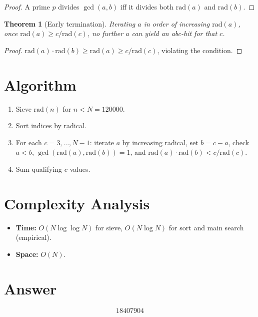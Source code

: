 \documentclass[11pt,a4paper]{article}
\newtheorem{theorem}{Theorem}
\begin{document}
\begin{proof}
A prime $p$ divides $\gcd(a,b)$ iff it divides both $\mathrm{rad}(a)$ and $\mathrm{rad}(b)$.
\end{proof}

\begin{theorem}[Early termination]
Iterating $a$ in order of increasing $\mathrm{rad}(a)$, once $\mathrm{rad}(a) \ge c/\mathrm{rad}(c)$, no further $a$ can yield an abc-hit for that $c$.
\end{theorem}

\begin{proof}
$\mathrm{rad}(a) \cdot \mathrm{rad}(b) \ge \mathrm{rad}(a) \ge c/\mathrm{rad}(c)$, violating the condition.
\end{proof}

\section{Algorithm}

\begin{enumerate}
\item Sieve $\mathrm{rad}(n)$ for $n < N = 120000$.
\item Sort indices by radical.
\item For each $c = 3, \ldots, N-1$: iterate $a$ by increasing radical, set $b = c - a$, check $a < b$, $\gcd(\mathrm{rad}(a), \mathrm{rad}(b)) = 1$, and $\mathrm{rad}(a) \cdot \mathrm{rad}(b) < c/\mathrm{rad}(c)$.
\item Sum qualifying $c$ values.
\end{enumerate}

\section{Complexity Analysis}

\begin{itemize}
\item \textbf{Time:} $O(N \log \log N)$ for sieve, $O(N \log N)$ for sort and main search (empirical).
\item \textbf{Space:} $O(N)$.
\end{itemize}

\section{Answer}

\[
\boxed{18407904}
\]
\end{document}
